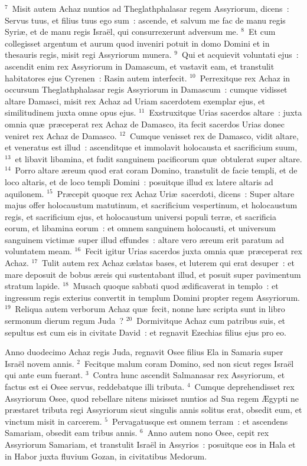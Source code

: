 ${}^{7}$~Misit autem Achaz nuntios ad Theglathphalasar regem Assyriorum, dicens~: Servus tuus, et filius tuus ego sum~: ascende, et salvum me fac de manu regis Syri\ae , et de manu regis Isra\"el, qui consurrexerunt adversum me.
${}^{8}$~Et cum collegisset argentum et aurum quod inveniri potuit in domo Domini et in thesauris regis, misit regi Assyriorum munera.
${}^{9}$~Qui et acquievit voluntati ejus~: ascendit enim rex Assyriorum in Damascum, et vastavit eam, et transtulit habitatores ejus Cyrenen~: Rasin autem interfecit.
${}^{10}$~Perrexitque rex Achaz in occursum Theglathphalasar regis Assyriorum in Damascum~: cumque vidisset altare Damasci, misit rex Achaz ad Uriam sacerdotem exemplar ejus, et similitudinem juxta omne opus ejus.
${}^{11}$~Exstruxitque Urias sacerdos altare~: juxta omnia qu\ae\ pr\ae ceperat rex Achaz de Damasco, ita fecit sacerdos Urias donec veniret rex Achaz de Damasco.
${}^{12}$~Cumque venisset rex de Damasco, vidit altare, et veneratus est illud~: ascenditque et immolavit holocausta et sacrificium suum,
${}^{13}$~et libavit libamina, et fudit sanguinem pacificorum qu\ae\ obtulerat super altare.
${}^{14}$~Porro altare \ae reum quod erat coram Domino, transtulit de facie templi, et de loco altaris, et de loco templi Domini~: posuitque illud ex latere altaris ad aquilonem.
${}^{15}$~Pr\ae cepit quoque rex Achaz Uri\ae\ sacerdoti, dicens~: Super altare majus offer holocaustum matutinum, et sacrificium vespertinum, et holocaustum regis, et sacrificium ejus, et holocaustum universi populi terr\ae , et sacrificia eorum, et libamina eorum~: et omnem sanguinem holocausti, et universum sanguinem victim\ae\ super illud effundes~: altare vero \ae reum erit paratum ad voluntatem meam.
${}^{16}$~Fecit igitur Urias sacerdos juxta omnia qu\ae\ pr\ae ceperat rex Achaz.
${}^{17}$~Tulit autem rex Achaz c\ae latas bases, et luterem qui erat desuper~: et mare deposuit de bobus \ae reis qui sustentabant illud, et posuit super pavimentum stratum lapide.
${}^{18}$~Musach quoque sabbati quod \ae dificaverat in templo~: et ingressum regis exterius convertit in templum Domini propter regem Assyriorum.
${}^{19}$~Reliqua autem verborum Achaz qu\ae\ fecit, nonne h\ae c scripta sunt in libro sermonum dierum regum Juda~?
${}^{20}$~Dormivitque Achaz cum patribus suis, et sepultus est cum eis in civitate David~: et regnavit Ezechias filius ejus pro eo.

\lettrine[lines=10,image=true,loversize=0.05,lraise=-0.03]{A}{}nno duodecimo Achaz regis Juda, regnavit Osee filius Ela in Samaria super Isra\"el novem annis.
${}^{2}$~Fecitque malum coram Domino, sed non sicut reges Isra\"el qui ante eum fuerant.
${}^{3}$~Contra hunc ascendit Salmanasar rex Assyriorum, et factus est ei Osee servus, reddebatque illi tributa.
${}^{4}$~Cumque deprehendisset rex Assyriorum Osee, quod rebellare nitens misisset nuntios ad Sua regem \AE gypti ne pr\ae staret tributa regi Assyriorum sicut singulis annis solitus erat, obsedit eum, et vinctum misit in carcerem.
${}^{5}$~Pervagatusque est omnem terram~: et ascendens Samariam, obsedit eam tribus annis.
${}^{6}$~Anno autem nono Osee, cepit rex Assyriorum Samariam, et transtulit Isra\"el in Assyrios~: posuitque eos in Hala et in Habor juxta fluvium Gozan, in civitatibus Medorum.


